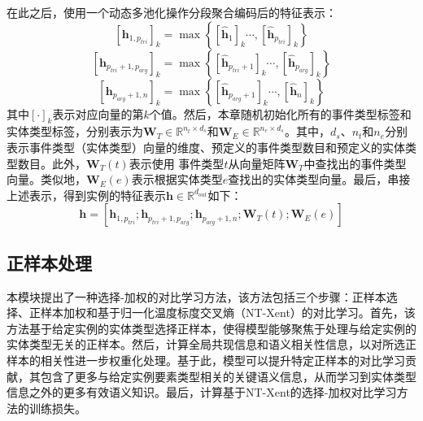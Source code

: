 在此之后，使用一个动态多池化操作分段聚合编码后的特征表示：
\begin{equation}
    \left[\boldsymbol{h}_{1, p_{tri}}\right]_{k}=\max \left\{\left[\boldsymbol{\hat{h}}_{1}\right]_{k} \cdots,\left[\boldsymbol{\hat{{h}}}_{p_{tri}}\right]_{k}\right\}
\end{equation}
\begin{equation}
    \left[\boldsymbol{{h}}_{p_{tri}+1, p_{arg}}\right]_{k}=\max \left\{\left[\boldsymbol{\hat{h}}_{p_{tri}+1}\right]_{k} \cdots,\left[\boldsymbol{\hat{{h}}}_{p_{arg}}\right]_{k}\right\}
\end{equation}
\begin{equation}
    \left[\boldsymbol{{h}}_{p_{arg}+1, n}\right]_{k}=\max \left\{\left[\boldsymbol{\hat{h}}_{p_{arg}+1}\right]_{k} \cdots,\left[\boldsymbol{\hat{{h}}}_{n}\right]_{k}\right\}
\end{equation}
其中$[\cdot]_{k}$表示对应向量的第$k$个值。然后，本章随机初始化所有的事件类型标签和实体类型标签，分别表示为$\boldsymbol{W}_{T} \in {\mathbb{R}}^{n_{t} \times d_{s}}$和$\boldsymbol{W}_{E} \in {\mathbb{R}}^{n_{e} \times d_{s}}$。其中，$d_{s}$、$n_{t}$和$n_{e}$分别表示事件类型（实体类型）向量的维度、预定义的事件类型数目和预定义的实体类型数目。此外，$\boldsymbol{W}_{T}\left(t\right)$表示使用
事件类型$t$从向量矩阵$\boldsymbol{W}_{T}$中查找出的事件类型向量。类似地，$\boldsymbol{W}_{E}\left(e\right)$表示根据实体类型$e$查找出的实体类型向量。最后，串接上述表示，得到实例的特征表示$\boldsymbol{h} \in {\mathbb{R}}^{d_{out}}$如下：
\begin{equation}
\label{input_information}
\boldsymbol{h}=\left[\boldsymbol{h}_{1, p_{tri}};\boldsymbol{{h}}_{p_{tri}+1, p_{arg}};\boldsymbol{{h}}_{p_{arg}+1, n};\boldsymbol{W}_{T}\left(t\right);\boldsymbol{W}_{E}\left(e\right)\right]
\end{equation}

\subsection{正样本处理}
本模块提出了一种选择-加权的对比学习方法，该方法包括三个步骤：正样本选择、正样本加权和基于归一化温度标度交叉熵（NT-Xent）的对比学习。首先，该方法基于给定实例的实体类型选择正样本，使得模型能够聚焦于处理与给定实例的实体类型无关的正样本。然后，计算全局共现信息和语义相关性信息，以对所选正样本的相关性进一步权重化处理。基于此，模型可以提升特定正样本的对比学习贡献，其包含了更多与给定实例要素类型相关的关键语义信息，从而学习到实体类型信息之外的更多有效语义知识。最后，计算基于NT-Xent的选择-加权对比学习方法的训练损失。

